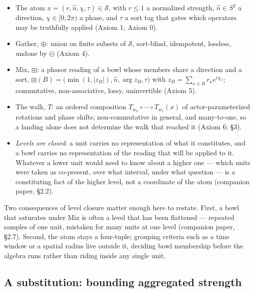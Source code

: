\documentclass[12pt, a4paper]{article}
\begin{document}
\begin{itemize}
\item The atom $x=(r,\hat n,\chi,\tau)\in\mathcal{S}$, with $r\le 1$ a
      normalized strength, $\hat n\in S^2$ a direction, $\chi\in[0,2\pi)$
      a phase, and $\tau$ a sort tag that gates which operators may be
      truthfully applied (Axiom 1; Axiom 0).
\item Gather, $\oplus$: union on finite subsets of $\mathcal{S}$,
      sort-blind, idempotent, lossless, undone by $\ominus$ (Axiom 4).
\item Mix, $\boxplus$: a phasor reading of a bowl whose members share a
      direction and a sort,
      $\boxplus(B)=\bigl(\min(1,|z_B|),\hat n,\arg z_B,\tau\bigr)$
      with $z_B=\sum_{x\in B} r_x e^{i\chi_x}$; commutative,
      non-associative, lossy, uninvertible (Axiom 5).
\item The walk, $T$: an ordered composition
      $T_{w_n}\circ\cdots\circ T_{w_1}(x)$ of actor-parameterized
      rotations and phase shifts; non-commutative in general, and
      many-to-one, so a landing alone does not determine the walk that
      reached it (Axiom 6; \S3).
\item \emph{Levels are closed}: a unit carries no representation of
      what it constitutes, and a bowl carries no representation of the
      reading that will be applied to it. Whatever a lower unit would
      need to know about a higher one --- which units were taken as
      co-present, over what interval, under what question --- is a
      constituting fact of the higher level, not a coordinate of the
      atom (companion paper, \S2.2).
\end{itemize}

Two consequences of level closure matter enough here to restate. First,
a bowl that saturates under Mix is often a level that has been
flattened --- repeated samples of one unit, mistaken for many units at
one level (companion paper, \S2.7). Second, the atom stays a
four-tuple; grouping criteria such as a time window or a spatial
radius live outside it, deciding bowl membership before the algebra
runs rather than riding inside any single unit.

\subsection{A substitution: bounding aggregated strength}
\label{subsec:bijection_substitution}
\end{document}
